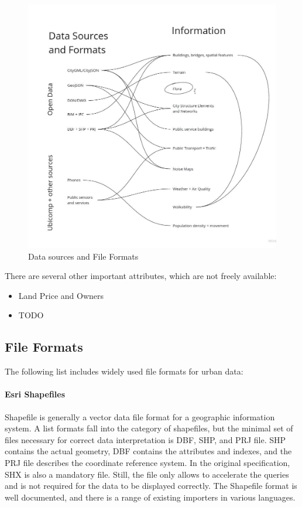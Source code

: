 \begin{figure}[h]
    \centering
    \includegraphics[width=\linewidth]{img/dataformats.jpg}
    \caption{Data sources and File Formats}
\end{figure}

There are several other important attributes, which are not freely available:
\begin{itemize}
    \item Land Price and Owners
    \item TODO
\end{itemize}

\subsection{File Formats}

The following list includes widely used file formats for urban data:

\paragraph{Esri Shapefiles} 
Shapefile is generally a vector data file format for a geographic information system. A list formats fall into the category of shapefiles, but the minimal set of files necessary for correct data interpretation is  DBF, SHP, and PRJ file. SHP contains the actual geometry, DBF contains the attributes and indexes, and the PRJ file describes the coordinate reference system. In the original specification, SHX is also a mandatory file. Still, the file only allows to accelerate the queries and is not required for the data to be displayed correctly. The Shapefile format is well documented, and there is a range of existing importers in various languages. 


